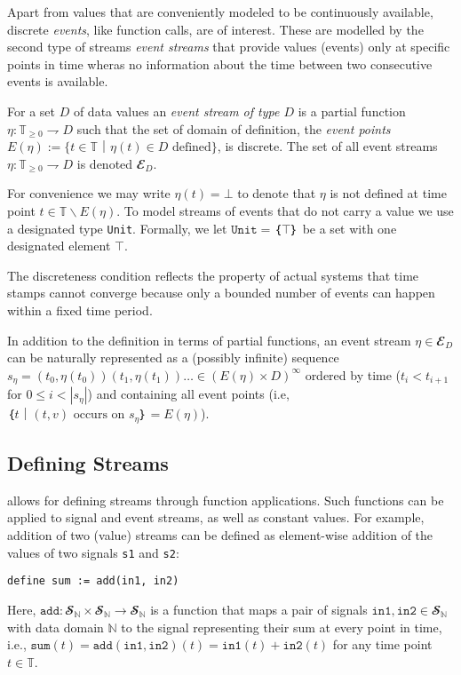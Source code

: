 Apart from values that are conveniently modeled to be continuously available, discrete \emph{events}, like function calls, are of interest.
These are modelled by the second type of streams \emph{event streams} that provide values (events) only at specific points in time wheras no information about the time between two consecutive events is available.

\begin{definition}
  For a set $D$ of data values an \emph{event stream of type $D$} is a partial function $η: 𝕋_{≥0} ⇁ D$ such that the set of domain of definition, the \emph{event points} $E(η) := \{t∈𝕋｜η(t)∈D \text{ defined}\}$, is discrete.
%
  The set of all event streams $η: 𝕋_{≥0} ⇁D$ is denoted $𝓔_D$.
\end{definition}

For convenience we may write $η(t) = ⊥$ to denote that $η$ is not defined at time point $t∈𝕋∖ E(η)$.
To model streams of events that do not carry a value we use a designated type \texttt{Unit}.
Formally, we let $\mathtt{Unit}=｛⊤｝$ be a set with one designated element $⊤$.

The discreteness condition reflects the property of actual systems that time stamps cannot converge because only a bounded number of events can happen within a fixed time period.

In addition to the definition in terms of partial functions, an event stream $η∈𝓔_D$ can be naturally represented as a (possibly infinite) sequence $s_η=(t_0,η(t_0))(t_1,η(t_1))…∈(E(η)×D)^∞$ ordered by time ($t_i<t_{i+1}$ for $0≤i<|s_η|$) and containing all event points (i.e, $｛t｜(t,v) \text{ occurs on } s_η｝= E(η)$).

\subsection{Defining Streams}

\tessla allows for defining streams through function applications.
Such functions can be applied to signal and event streams, as well as constant values.
For example, addition of two (value) streams can be defined as element-wise addition of the values of two signals \texttt{s1} and \texttt{s2}:
\begin{lstlisting}[language=tessla]
  define sum := add(in1, in2)
\end{lstlisting}
Here, $\mathtt{add}: 𝓢_ℕ × 𝓢_ℕ → 𝓢_ℕ$ is a function that maps a pair of signals $\mathtt{in1},\mathtt{in2}∈𝓢_ℕ$ with data domain $ℕ$ to the signal representing their sum at every point in time, i.e.,  $\mathtt{sum}(t) = \mathtt{add}(\mathtt{in1}, \mathtt{in2})(t) = \mathtt{in1}(t) + \mathtt{in2}(t)$ for any time point $t∈𝕋$.

